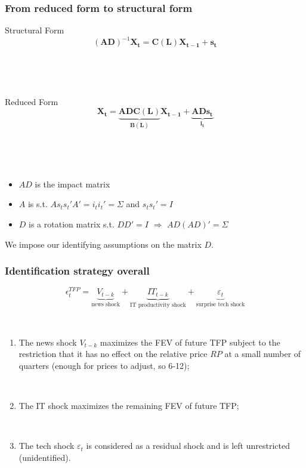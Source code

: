 \documentclass{beamer}
\begin{document}
\begin{frame}
	\frametitle{From reduced form to structural form}
	\label{identification}
	
Structural Form	
\begin{equation}
(\mathbf{AD})^{-1}
    \mathbf{X_{t}}
= \mathbf{C(L)} 
\mathbf{X_{t-1}}
+ \mathbf{s_t}
\end{equation}

\

\

Reduced Form
\begin{equation}
\mathbf{X_{t}}
= \underbrace{\mathbf{AD} \mathbf{C(L)}}_\text{$\mathbf{B(L)}$} 
\mathbf{X_{t-1}}
+ \underbrace{\mathbf{AD} \mathbf{s_t}}_\text{$\mathbf{i_t}$}
\end{equation}

\

\

\begin{itemize}
	\item $AD$ is the impact matrix
	\item $A$ is s.t. $As_t s_t' A' = i_t i_t' = \Sigma$ and $s_t s_t' = I$
	\item $D$ is a rotation matrix s.t. $DD' = I$ $\Rightarrow$ $AD(AD)' = \Sigma$
\end{itemize}

We impose our identifying assumptions on the matrix $D$. \hyperlink{Technicalities}{}

\end{frame}


\begin{frame}
	\frametitle{Identification strategy overall}

\begin{equation}
\epsilon^{TFP}_t =   \underbrace{V_{t-k}}_\text{news shock} + \underbrace{IT_{t-k}}_\text{IT productivity shock}  + \underbrace{\varepsilon_t}_\text{surprise tech shock} 
\end{equation}

\

    \begin{enumerate}
    	\item The news shock $V_{t-k}$ maximizes the FEV of future TFP subject to the restriction that it has no effect on the relative price $RP$ at a small number of quarters (enough for prices to adjust, so 6-12);
	
	\
	
    \item The IT shock maximizes the remaining FEV of future TFP;
    
    \
    
    \item The tech shock $\varepsilon_t$ is considered as a residual shock and is left unrestricted (unidentified).
   \end{enumerate}
	
	
\end{frame}
\end{document}
